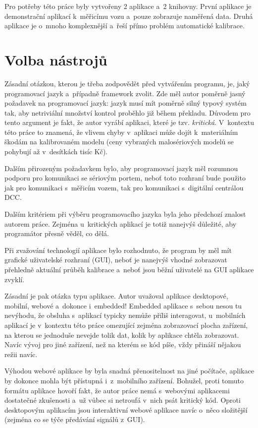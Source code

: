 Pro potřeby této práce byly vytvořeny 2 aplikace a~2 knihovny. První aplikace
je demonstrační aplikací k~měřicímu vozu a~pouze zobrazuje naměřená data. Druhá
aplikace je o~mnoho komplexnější a~řeší přímo problém automatické kalibrace.

\section{Volba nástrojů}
\label{sec:sw-nastroje}

Zásadní otázkou, kterou je třeba zodpovědět před vytvářením programu, je,
jaký programovací jazyk a~případně framework zvolit. Zde měl autor poměrně
jasný požadavek na programovací jazyk: jazyk musí mít poměrně silný typový
systém tak, aby netriviální množství kontrol proběhlo již během překladu.
Důvodem pro tento argument je fakt, že autor vyrábí aplikaci, které je tzv.
\textit{kritická}. V~kontextu této práce to znamená, že vlivem chyby
v~aplikaci může dojít k~materiálním škodám na kalibrovaném modelu (ceny
vybraných malosériových modelů se pohybují až v~desítkách tisíc Kč).

Dalším přirozeným požadavkem bylo, aby programovací jazyk měl rozumnou podporu
pro komunikaci se sériovým portem, neboť toto rozhraní bude použito jak pro
komunikaci s~měřicím vozem, tak pro komunikaci s~digitální centrálou \gls{DCC}.

Dalším kritériem při výběru programovacího jazyka byla jeho předchozí znalost
autorem práce. Zejména u~kritických aplikací je totiž nanejvýš důležité, aby
programátor přesně věděl, co dělá.

Při zvažování technologií aplikace bylo rozhodnuto, že program by měl
mít grafické uživatelské rozhraní (GUI), neboť je nanejvýš vhodné zobrazovat
přehledně aktuální průběh kalibrace a~neboť jsou běžní uživatelé na GUI
aplikace zvyklí.

Zásadní je pak otázka typu aplikace. Autor uvažoval aplikace desktopové,
mobilní, webové a~dokonce i~embedded! Embedded aplikace s~sebou nesou tu
nevýhodu, že obsluha s~aplikací typicky nemůže příliš interagovat, u~mobilních
aplikací je v~kontextu této práce omezující zejména zobrazovací plocha
zařízení, na kterou se jednoduše nevejde tolik dat, kolik by aplikace chtěla
zobrazovat. Navíc vývoj pro jiné zařízení, než na kterém se kód píše, vždy
přináší nějakou režii navíc.

Výhodou webové aplikace by byla snadná přenositelnost na jiné počítače,
aplikace by dokonce mohla být přístupná i~z~mobilního zařízení. Bohužel, proti
tomuto formátu aplikace hovoří fakt, že autor práce nemá s~webovými aplikacemi
dostatečné zkušenosti a~už vůbec si netroufá v~nich psát kritický kód.
Oproti desktopovým aplikacím jsou interaktivní webové aplikace navíc o~něco
složitější (zejména co se týče předávání signálů z~GUI).

